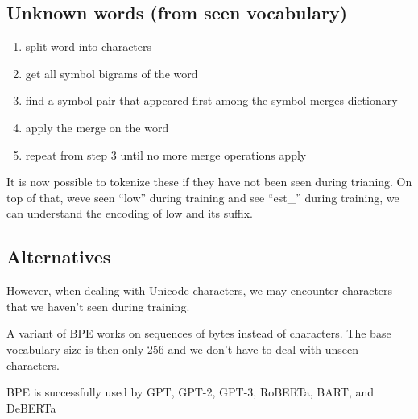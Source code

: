 \documentclass[11pt]{article}
\begin{document}
\subsection{Unknown words (from seen vocabulary)}

\begin{enumerate}
    \item split word into characters
    \item get all symbol bigrams of the word
    \item find  a symbol pair that appeared first among the symbol merges dictionary
    \item apply the merge on the word
    \item repeat from step 3 until no more merge operations apply
\end{enumerate}

\begin{figure}[H]
    \centering
\end{figure}

It is now possible to tokenize these if they have not been seen during trianing. On top of that, weve seen ``low'' during training and see ``est\_'' during training, we can understand the encoding of low and its suffix.

\subsection{Alternatives}

However, when dealing with Unicode characters, we may encounter characters that we haven’t seen during training.

A variant of BPE works on sequences of bytes instead of characters. The base vocabulary size is then only 256 and we don’t have to deal with unseen characters.

BPE is successfully used by GPT, GPT-2, GPT-3, RoBERTa, BART, and DeBERTa

\printbibliography
\end{document}
